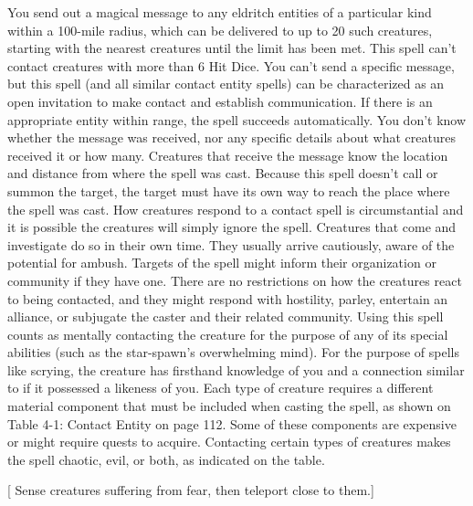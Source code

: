 {You send out a magical message to any eldritch entities of a particular kind within a 100-mile radius, which can be delivered to up to 20 such creatures, starting with the nearest creatures until the limit has been met. This spell can't contact creatures with more than 6 Hit Dice. You can't send a specific message, but this spell (and all similar contact entity spells) can be characterized as an open invitation to make contact and establish communication. If there is an appropriate entity within range, the spell succeeds automatically. You don't know whether the message was received, nor any specific details about what creatures received it or how many. Creatures that receive the message know the location and distance from where the spell was cast. Because this spell doesn't  call or summon the target, the target must have its own way to reach the place where the spell was cast.  How creatures respond to a contact spell is circumstantial and it is possible the creatures will simply ignore the spell. Creatures that come and investigate do so in their own time. They usually arrive cautiously, aware of the potential for ambush. Targets of the spell might inform their organization or community if they have one. There are no restrictions on how the creatures react to being contacted, and they might respond with hostility, parley, entertain an alliance, or subjugate the caster and their related community. Using this spell counts as mentally contacting the creature for the purpose of any of its special abilities (such as the star-spawn's overwhelming mind). For the purpose of spells like scrying, the creature has firsthand knowledge of you and a connection similar to if it possessed a likeness of you.  Each type of creature requires a different material component that must be included when casting the spell, as shown on Table 4-1: Contact Entity on page 112. Some of these components are expensive or might require quests to acquire. Contacting certain types of creatures makes the spell chaotic, evil, or both, as indicated on the table.}
        
[ Sense creatures suffering from fear, then teleport close to them.]
        
